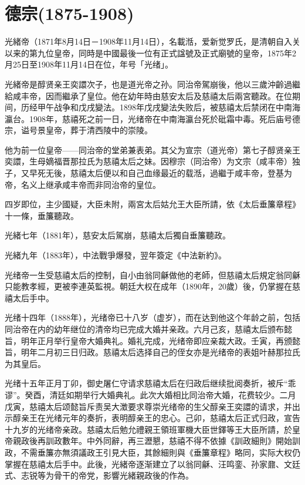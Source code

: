 
\section{德宗\tiny(1875-1908)}

光緒帝（1871年8月14日－1908年11月14日），名載湉，爱新觉罗氏，是清朝自入关以来的第九位皇帝，同時是中國最後一位有正式諡號及正式廟號的皇帝，1875年2月25日至1908年11月14日在位，年号「光绪」。

光緒帝是醇贤亲王奕譞次子，也是道光帝之孙。同治帝駕崩後，他以三歲沖齡過繼給咸丰帝，因而繼承了皇位。他在幼年時由慈安太后及慈禧太后兩宮聽政。在位期间，历经甲午战争和戊戌變法。1898年戊戌變法失败后，被慈禧太后禁闭在中南海瀛台。1908年，慈禧死之前一日，光绪帝在中南海瀛台死於砒霜中毒。死后庙号德宗，谥号景皇帝，葬于清西陵中的崇陵。

他为前一位皇帝——同治帝的堂弟兼表弟。其父为宣宗（道光帝）第七子醇贤亲王奕譞，生母嫡福晋那拉氏为慈禧太后之妹。因穆宗（同治帝）为文宗（咸丰帝）独子，又早死无後，慈禧太后便以和自己血缘最近的载湉，過繼于咸丰帝，登基为帝，名义上继承咸丰帝而非同治帝的皇位。


四岁即位，主少國疑，大臣未附，兩宮太后姑允王大臣所請，依《太后垂簾章程》十一條，垂簾聽政。

光緒七年（1881年），慈安太后駕崩，慈禧太后獨自垂簾聽政。

光緒九年（1883年），中法戰爭爆發，翌年簽定《中法新約》。

光绪帝一生受慈禧太后的控制，自小由翁同龢做他的老師，但慈禧太后規定翁同龢只能教孝經，更被李連英監視。朝廷大权在成年（1890年，20歲）後，仍掌握在慈禧太后手中。

光绪十四年（1888年），光绪帝已十八岁（虚岁），而在达到他这个年龄之前，包括同治帝在内的幼年继位的清帝均已完成大婚并亲政。六月己亥，慈禧太后颁布懿旨，明年正月举行皇帝大婚典礼。婚礼完成，光绪帝即应亲裁大政。壬寅，再颁懿旨，明年二月初三日归政。慈禧太后选择自己的侄女亦是光绪帝的表姐叶赫那拉氏为其皇后。

光绪十五年正月丁卯，御史屠仁守请求慈禧太后在归政后继续批阅奏折，被斥“乖谬”。癸酉，清廷如期举行大婚典礼。此次大婚相比同治帝大婚，花费较少。二月戊寅，慈禧太后颂懿旨斥责吴大澂要求尊崇光绪帝的生父醇亲王奕譞的请求，并出示醇亲王在光绪元年的奏折，表明醇亲王的忠心。己卯，慈禧太后正式归政，宣告十九岁的光绪帝亲政。慈禧太后勉允禮親王領班軍機大臣世鐸等王大臣所請，於皇帝親政後再訓政數年。中外同辭，再三瀝懇，慈禧不得不依據《訓政細則》開始訓政，不需垂簾亦無須議政王引見大臣，其餘細則與《垂簾章程》略同，实际大权仍掌握在慈禧太后手中。此後，光緒帝逐渐建立了以翁同龢、汪鸣銮、孙家鼐、文廷式、志锐等为骨干的帝党，影響光緒親政後的作為。

